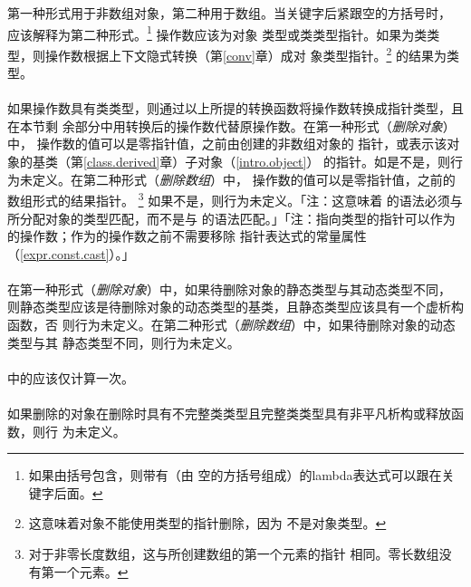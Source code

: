 第一种形式用于非数组对象，第二种用于数组。当关键字后紧跟空的方括号时，
应该解释为第二种形式。\footnote{如果由括号包含，则带有（由
空的方括号组成）的lambda表达式可以跟在关键字后面。} 操作数应该为对象
类型或类类型指针。如果为类类型，则操作数根据上下文隐式转换（第\ref{conv}章）成对
象类型指针。\footnote{这意味着对象不能使用类型的指针删除，因为
不是对象类型。} 的结果为类型。

\paragraph{}
如果操作数具有类类型，则通过以上所提的转换函数将操作数转换成指针类型，且在本节剩
余部分中用转换后的操作数代替原操作数。在第一种形式（\textit{删除对象}）中，
操作数的值可以是零指针值，之前由创建的非数组对象的
指针，或表示该对象的基类（第\ref{class.derived}章）子对象（\ref{intro.object}）
的指针。如是不是，则行为未定义。在第二种形式（\textit{删除数组}）中，
操作数的值可以是零指针值，之前的数组形式的结果指针。
\footnote{对于非零长度数组，这与所创建数组的第一个元素的指针
相同。零长数组没有第一个元素。} 如果不是，则行为未定义。「注：这意味着
的语法必须与所分配对象的类型匹配，而不是与
的语法匹配。」「注：指向类型的指针可以作为
的操作数；作为的操作数之前不需要移除
指针表达式的常量属性（\ref{expr.const.cast}）。」

\paragraph{}
在第一种形式（\textit{删除对象}）中，如果待删除对象的静态类型与其动态类型不同，
则静态类型应该是待删除对象的动态类型的基类，且静态类型应该具有一个虚析构函数，否
则行为未定义。在第二种形式（\textit{删除数组}）中，如果待删除对象的动态类型与其
静态类型不同，则行为未定义。

\paragraph{}
中的应该仅计算一次。

\paragraph{}
如果删除的对象在删除时具有不完整类类型且完整类类型具有非平凡析构或释放函数，则行
为未定义。

